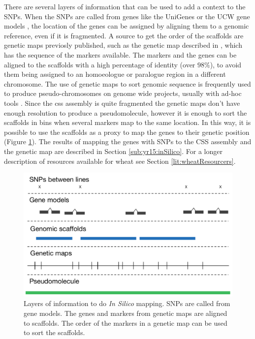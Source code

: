 There are several layers of information that can be used to add a context to the SNPs. 
When the SNPs are called from genes like the UniGenes \citep{PontiusJUWagnerL2002} or the UCW gene models \citep{Krasileva2013}, the location of the genes can be assigned by aligning them to a genomic reference, even if it is fragmented. 
A source to get the order of the scaffolds are genetic maps previosly published, such as the genetic map described in \citet{Wang2014}, which has the sequence of the markers available.
The markers and the genes can be aligned to the scaffolds with a high percentage of identity (over $98\%$), to avoid them being assigned to an homoeologue or paralogue region in a different chromosome.
The use of genetic maps to sort genomic sequence is frequently used to produce pseudo-chromosomes on genome wide projects, usually with ad-hoc tools \citep{Tang2015}.
Since the \acrshort{css} assembly is quite fragmented the genetic maps don't have enough resolution to produce a pseudomolecule, however it is enough to sort the scaffolds in bins when several markers map to the same location. 
In this way, it is possible to use the scaffolds as a proxy to map the genes to their genetic position (Figure \ref{fig:yr15:layersOfMapping}).
The results of mapping the genes with SNPs to the CSS assembly and the genetic map are described in Section \ref{sub:yr15:inSilico}. 
For a longer description of resources available for wheat see Section \ref{lit:wheatResourcers}. 

\begin{figure}
  \centering
  \includegraphics[width=1\textwidth]{Yr15/Figures/mapping/layersOfMapping.pdf}
  \caption{Layers of information to do \textit{In Silico} mapping. SNPs are called from gene models. The genes and markers from genetic maps are aligned to scaffolds. The order of the markers in a genetic map can be used to sort the scaffolds.} 
  \label{fig:yr15:layersOfMapping}
\end{figure}

